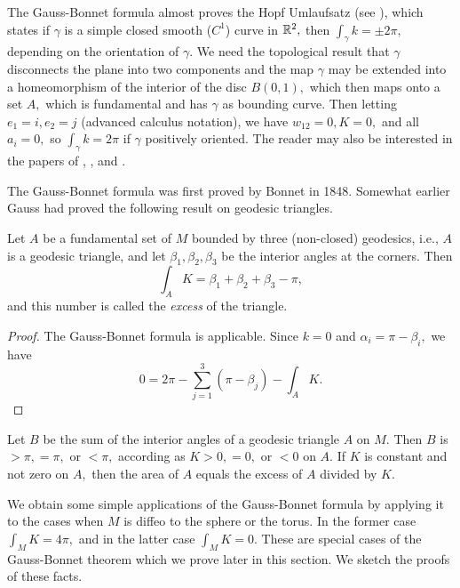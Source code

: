 \documentclass[../main]{subfiles}
\begin{document}
The Gauss-Bonnet formula almost proves the Hopf Umlaufsatz (see \cite{hopf1926uber}), which states if $\gamma$ is a simple closed smooth ($C^1$) curve in $\mathbb{R}^2,$ then $\int_{\gamma}k=\pm 2\pi,$ depending on the orientation of $\gamma.$ We need the topological result that $\gamma$ disconnects the plane into two components and the map $\gamma$ may be extended into a homeomorphism of the interior of the disc $B(0,1),$ which then maps onto a set $A,$ which is fundamental and has $\gamma$ as bounding curve. Then letting $e_1=i, e_2=j$ (advanced calculus notation), we have $w_{12}=0, K=0,$ and all $a_i=0,$ so $\int_{\gamma}k=2\pi$ if $\gamma$ positively oriented. The reader may also be interested in the papers of \cite{Whitney1937}, \cite{griffin1958on}, and \cite{titus1960a}.

The Gauss-Bonnet formula was first proved by Bonnet in 1848. Somewhat earlier Gauss had proved the following result on geodesic triangles.



\begin{theorem}[Gauss] \label{thm:ch8.1.2}
Let $A$ be a fundamental set of $M$ bounded by three (non-closed) geodesics, i.e., $A$ is a geodesic triangle, and let $\beta_1, \beta_2, \beta_3$ be the interior angles at the corners. Then \[\int_{A}K=\beta_1+\beta_2+\beta_3-\pi,\] and this number is called the \emph{excess} of the triangle. 
\end{theorem}

\begin{proof}
The Gauss-Bonnet formula is applicable. Since $k=0$ and $\alpha_i=\pi-\beta_i,$ we have \[0=2\pi-\sum_{j=1}^3(\pi-\beta_j)-\int_{A}K.\]
\end{proof}



\begin{corollary} \label{cor:ch8.1.3}
Let $B$ be the sum of the interior angles of a geodesic triangle $A$ on $M.$ Then $B$ is $>\pi, =\pi,$ or $<\pi,$ according as $K>0, =0,$ or $<0$ on $A.$ If $K$ is constant and not zero on $A,$ then the area of $A$ equals the excess of $A$ divided by $K.$ 
\end{corollary}



We obtain some simple applications of the Gauss-Bonnet formula by applying it to the cases when $M$ is diffeo to the sphere or the torus. In the former case $\int_{M}K=4\pi,$ and in the latter case $\int_{M}K=0.$ These are special cases of the Gauss-Bonnet theorem which we prove later in this section. We sketch the proofs of these facts.
\end{document}
